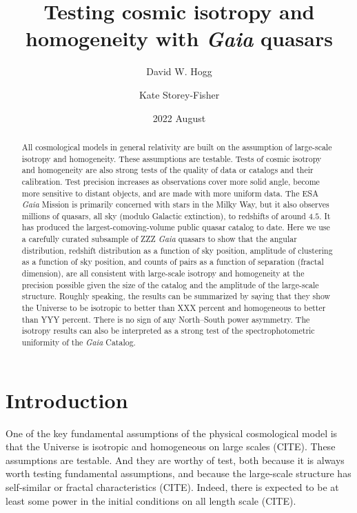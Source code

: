 \documentclass[modern]{aastex631}
\begin{document}
\title{%
Testing cosmic isotropy and homogeneity
with \textsl{Gaia} quasars}
\author{David W. Hogg}

\author{Kate Storey-Fisher}

\date{2022 August}

\begin{abstract}\noindent
All cosmological models in general relativity are built on the assumption of large-scale isotropy and homogeneity.
These assumptions are testable.
Tests of cosmic isotropy and homogeneity are also strong tests of the quality of data or catalogs and their calibration.
Test precision increases as observations cover more solid angle, become more sensitive to distant objects, and are made with more uniform data.
The ESA \textsl{Gaia} Mission is primarily concerned with stars in the Milky Way, but it also observes millions of quasars, all sky (modulo Galactic extinction), to redshifts of around $4.5$.
It has produced the largest-comoving-volume public quasar catalog to date.
Here we use a carefully curated subsample of ZZZ \textsl{Gaia} quasars to show that the angular distribution, redshift distribution as a function of sky position, amplitude of clustering as a function of sky position, and counts of pairs as a function of separation (fractal dimension), are all consistent with large-scale isotropy and homogeneity at the precision possible given the size of the catalog and the amplitude of the large-scale structure.
Roughly speaking, the results can be summarized by saying that they show the Universe to be isotropic to better than XXX percent and homogeneous to better than YYY percent.
There is no sign of any North--South power asymmetry.
The isotropy results can also be interpreted as a strong test of the spectrophotometric uniformity of the \textsl{Gaia} Catalog.
\end{abstract}


\section{Introduction}

One of the key fundamental assumptions of the physical cosmological model is that the Universe is isotropic and homogeneous on large scales (CITE).
These assumptions are testable.
And they are worthy of test, both because it is always worth testing fundamental assumptions, and because the large-scale structure has self-similar or fractal characteristics (CITE).
Indeed, there is expected to be at least some power in the initial conditions on all length scale (CITE).
\end{document}
